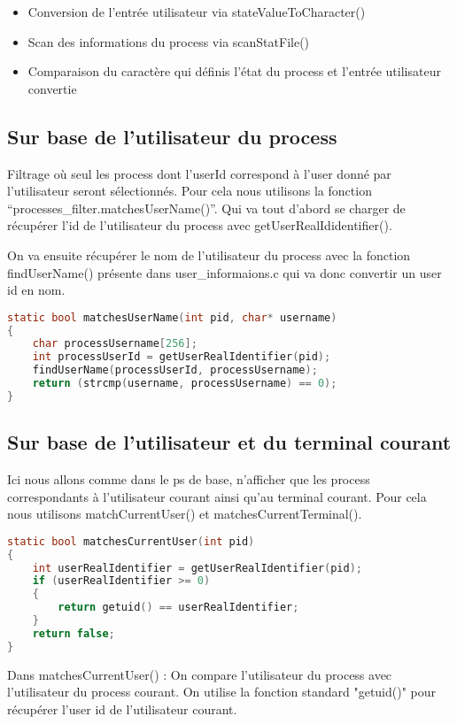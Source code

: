 \begin{itemize}
\item Conversion de l'entrée utilisateur via stateValueToCharacter()
\item Scan des informations du process via scanStatFile()
\item Comparaison du caractère qui définis l'état du process et l'entrée utilisateur convertie
\end{itemize}


\subsection{Sur base de l’utilisateur du process}
Filtrage où seul les process dont l’userId correspond à l’user donné par l’utilisateur seront sélectionnés. Pour cela nous utilisons la fonction “processes\_filter.matchesUserName()”. Qui va tout d’abord se charger de récupérer l’id de l’utilisateur du process avec getUserRealIdidentifier().

On va ensuite récupérer le nom de l'utilisateur du process avec la fonction findUserName() présente dans user\_informaions.c qui va donc convertir un user id en nom.


\begin{lstlisting}[frame=single, language=c]
static bool matchesUserName(int pid, char* username)
{
    char processUsername[256];
    int processUserId = getUserRealIdentifier(pid);
    findUserName(processUserId, processUsername);
    return (strcmp(username, processUsername) == 0);
}
\end{lstlisting}



\subsection{Sur base de l’utilisateur et du terminal courant} 
Ici nous allons comme dans le ps de base, n'afficher que les process correspondants à l'utilisateur courant ainsi qu'au terminal courant. Pour cela nous utilisons matchCurrentUser() et matchesCurrentTerminal().


\begin{lstlisting}[frame=single, language=c]
static bool matchesCurrentUser(int pid)
{
    int userRealIdentifier = getUserRealIdentifier(pid);
    if (userRealIdentifier >= 0)
    {
        return getuid() == userRealIdentifier;
    }
    return false;
}
\end{lstlisting}

Dans matchesCurrentUser() : On compare l'utilisateur du process avec l'utilisateur du process courant. On utilise la fonction standard "getuid()" pour récupérer l'user id de l'utilisateur courant.


